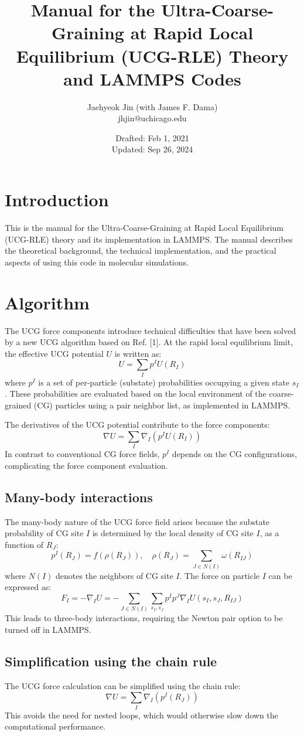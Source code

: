 \documentclass{article}
\title{Manual for the Ultra-Coarse-Graining at Rapid Local Equilibrium (UCG-RLE) Theory and LAMMPS Codes}
\author{Jaehyeok Jin (with James F. Dama)\\ jhjin@uchicago.edu}
\date{Drafted: Feb 1, 2021 \\ Updated: Sep 26, 2024}
\begin{document}
\maketitle

\section{Introduction}
This is the manual for the Ultra-Coarse-Graining at Rapid Local Equilibrium (UCG-RLE) theory and its implementation in LAMMPS. The manual describes the theoretical background, the technical implementation, and the practical aspects of using this code in molecular simulations.

\section{Algorithm}
The UCG force components introduce technical difficulties that have been solved by a new UCG algorithm based on Ref. [1]. At the rapid local equilibrium limit, the effective UCG potential \( U \) is written as:
\[
U = \sum_{I} p^I U(R_I)
\]
where \( p^I \) is a set of per-particle (substate) probabilities occupying a given state \( s_I \). These probabilities are evaluated based on the local environment of the coarse-grained (CG) particles using a pair neighbor list, as implemented in LAMMPS.

The derivatives of the UCG potential contribute to the force components:
\[
\nabla U = \sum_{I} \nabla_I \left( p^I U(R_I) \right)
\]
In contrast to conventional CG force fields, \( p^I \) depends on the CG configurations, complicating the force component evaluation.

\subsection{Many-body interactions}
The many-body nature of the UCG force field arises because the substate probability of CG site \( I \) is determined by the local density of CG site \( I \), as a function of \( R_J \):
\[
p^I(R_J) = f\left( \rho(R_J) \right), \quad \rho(R_J) = \sum_{J \in N(I)} \omega(R_{IJ})
\]
where \( N(I) \) denotes the neighbors of CG site \( I \). The force on particle \( I \) can be expressed as:
\[
F_I = - \nabla_I U = - \sum_{J \in N(I)} \sum_{s_I, s_J} p^I p^J \nabla_I U(s_I, s_J, R_{IJ})
\]
This leads to three-body interactions, requiring the Newton pair option to be turned off in LAMMPS.

\subsection{Simplification using the chain rule}
The UCG force calculation can be simplified using the chain rule:
\[
\nabla U = \sum_{I} \nabla_I \left( p^I(R_J) \right)
\]
This avoids the need for nested loops, which would otherwise slow down the computational performance.
\end{document}
